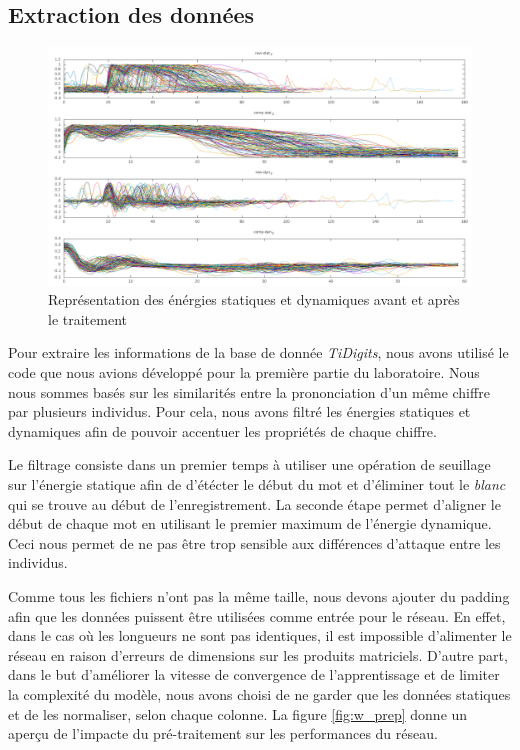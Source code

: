 \documentclass[11pt]{article}
\begin{document}
\subsection{Extraction des donn\'ees}

\begin{figure}[h]
	\centering
	\includegraphics[scale=.3]{img/preprocessing.png}
	\caption{Repr\'esentation des \'en\'ergies statiques et dynamiques avant et
	apr\`es le traitement}
\end{figure}

Pour extraire les informations de la base de donn\'ee {\em TiDigits}, nous avons
utilis\'e le code que nous avions d\'evelopp\'e pour la premi\`ere partie du laboratoire.
Nous nous sommes bas\'es sur les similarit\'es entre la prononciation d'un
m\^eme chiffre par plusieurs individus. Pour cela, nous avons filtr\'e
les \'energies statiques et dynamiques afin de pouvoir accentuer les
propri\'et\'es de chaque chiffre.


Le filtrage consiste dans un premier temps \`a utiliser une op\'eration de
seuillage sur l'\'energie statique afin de d'\'et\'ecter le d\'ebut du mot et
d'\'eliminer tout le {\em blanc} qui se trouve au d\'ebut de l'enregistrement.
La seconde \'etape permet d'aligner le d\'ebut de chaque mot en utilisant le
premier maximum de l'\'energie dynamique.
Ceci nous permet de ne pas \^etre trop sensible aux diff\'erences d'attaque
entre les individus.

Comme tous les fichiers n'ont pas la m\^eme taille, nous devons ajouter
du padding afin que les donn\'ees puissent \^etre utilis\'ees comme
entr\'ee pour le r\'eseau. En effet, dans le cas o\`u les longueurs ne sont pas
identiques, il est impossible d'alimenter le r\'eseau en raison d'erreurs
de dimensions sur les produits matriciels.
D'autre part, dans le but d'am\'eliorer la vitesse de convergence de
l'apprentissage et de limiter la complexit\'e du mod\`ele, nous avons choisi de
ne garder que les donn\'ees statiques et de les normaliser, selon chaque colonne.
La figure \ref{fig:w_prep} donne un aper\c cu de l'impacte du pr\'e-traitement
sur les performances du r\'eseau.
\end{document}

